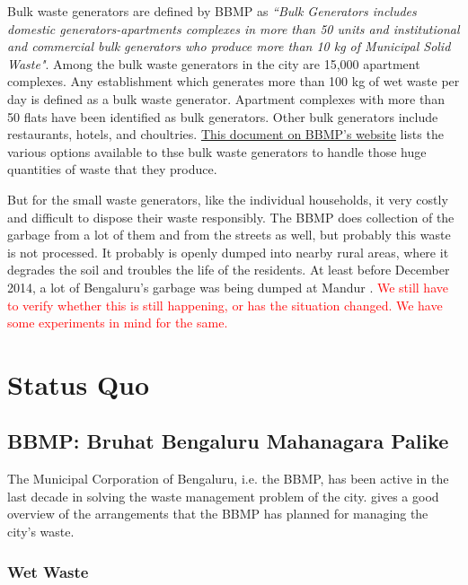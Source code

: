 \documentclass[10pt]{article}
\begin{document}
Bulk waste generators are defined by BBMP as \emph{``Bulk Generators includes domestic generators-apartments complexes in more than 50 units and institutional and commercial bulk generators who produce more than 10 kg of Municipal Solid Waste"}. Among the bulk waste generators in the city are 15,000 apartment complexes. Any establishment which generates more than 100 kg of wet waste per day is defined as a bulk waste generator. Apartment complexes with more than 50 flats have been identified as bulk generators. Other bulk generators include restaurants, hotels, and choultries\citep{BangaloreMirror:bulk_waste_generators}. \href{http://bbmp.gov.in/documents/10180/2201631/Approved+Vendor+List+with+note+for+Website+21-06-2016.pdf/34567fdf-8d69-4b12-8440-9475ba4a0567}{This document on BBMP's website} lists the various options available to thse bulk waste generators to handle those huge quantities of waste that they produce.

But for the small waste generators, like the individual households, it very costly and difficult to dispose their waste responsibly. The BBMP does collection of the garbage from a lot of them and from the streets as well, but probably this waste is not processed. It probably is openly dumped into nearby rural areas, where it degrades the soil and troubles the life of the residents. At least before December 2014, a lot of Bengaluru's garbage was being dumped at Mandur \citep{BangaloreMirror:bulk_waste_generators}.
\textcolor{red}{We still have to verify whether this is still happening, or has the situation changed. We have some experiments in mind for the same.}

\section{Status Quo}



\subsection{BBMP: Bruhat Bengaluru Mahanagara Palike}

The Municipal Corporation of Bengaluru, i.e. the BBMP, has been active in the last decade in solving the waste management problem of the city. \cite{BBMP:SWMOverview} gives a good overview of the arrangements that the BBMP has planned for managing the city's waste.

\subsubsection{Wet Waste}
\end{document}
